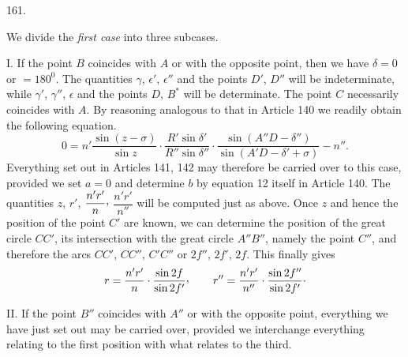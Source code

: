\par{}\medskip
{}\begin{center}\hypertarget{native-224-article161}{}161.\end{center}
We divide the \emph{first case} into three subcases.

I. If the point $B$ coincides with $A$ or with the opposite point, then we have $\delta=0$ or $=180^0$. The quantities $\gamma$, $\epsilon'$, $\epsilon''$ and the points $D'$, $D''$ will be indeterminate, while $\gamma'$, $\gamma''$, $\epsilon$ and the points $D$, $B^*$ will be determinate. The point $C$ necessarily coincides with $A$. By reasoning analogous to that in Article 140 we readily obtain the following equation.
\[
0=n'\frac{\sin(z-\sigma)}{\sin z}\cdot\frac{R'\sin\delta'}{R''\sin\delta''}
\cdot\frac{\sin(A''D-\delta'')}{\sin(A'D-\delta'+\sigma)}-n''.
\]
Everything set out in Articles 141, 142 may therefore be carried over to this case, provided we set $a=0$ and determine $b$ by equation 12 itself in Article 140. The quantities $z$, $r'$, $\dfrac{n'r'}{n}\mathpunct{\raisebox{.45ex}{,}}$
$\dfrac{n'r'}{n''}$ will be computed just as above. Once $z$ and hence the position of the point $C'$ are known, we can determine the position of the great circle $CC'$, its intersection with the great circle $A''B''$, namely the point $C''$, and therefore the arcs $CC'$, $CC''$, $C'C''$ or $2f''$, $2f'$, $2f$. This finally gives
\[
r=\frac{n'r'}{n}\cdot\frac{\sin2f}{\sin2f'}\mathpunct{\raisebox{.45ex}{,}}\qquad
r''=\frac{n'r'}{n''}\cdot\frac{\sin2f''}{\sin2f'}\mathpunct{\cdot}
\]

II. If the point $B''$ coincides with $A''$ or with the opposite point, everything we have just set out may be carried over, provided we interchange everything relating to the first position with what relates to the third.

